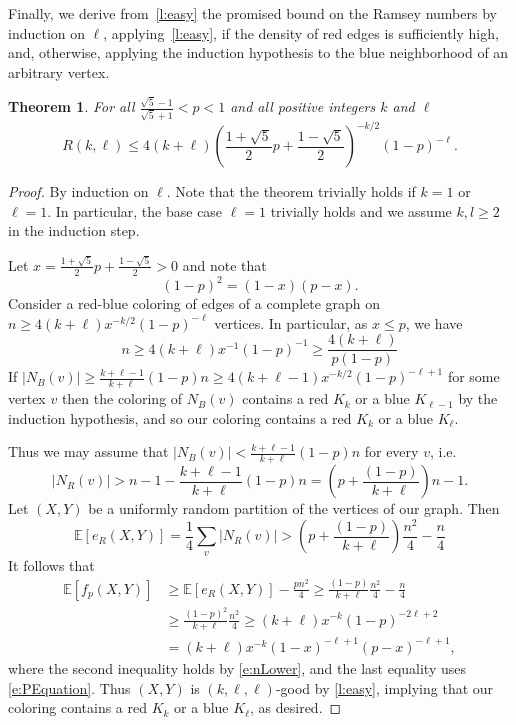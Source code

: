 \documentclass[reqno,final,12pt]{amsart}
\newtheorem{thm}{Theorem}
\newcommand{\bb}[1]{\mathbb{#1}}
\newcommand{\s}[1]{\left(#1\right)}
\begin{document}
Finally, we derive from~\cref{l:easy} the promised bound on the Ramsey numbers by induction on $\ell$, applying~\cref{l:easy}, if the density of red edges is sufficiently high, and, otherwise, applying the induction hypothesis to the blue neighborhood of an arbitrary vertex.  

\begin{thm}\label{t:easy}
	For all $\frac{\sqrt{5}-1}{\sqrt{5}+1}< p <1$ and all positive integers $k$ and  $\ell$ $$R(k,\ell) \leq 4(k+\ell)\s{\frac{1+\sqrt{5}}{2}p+\frac{1-\sqrt{5}}{2}}^{-k/2}(1-p)^{-\ell}.$$
\end{thm}
\begin{proof}
	By induction on $\ell$. Note that the theorem trivially holds if $k=1$ or $\ell =1 $. In particular, the base case $\ell=1$ trivially holds and we assume $k, l \geq 2$ in the induction step.
	
	Let $x = \frac{1+\sqrt{5}}{2}p+\frac{1-\sqrt{5}}{2} >0$ and note that 	\begin{equation}\label{e:PEquation}
(1-p)^2=(1-x)(p-x).
	\end{equation} Consider a red-blue coloring of edges of a complete graph on $n \geq 4(k+\ell)x^{-k/2}(1-p)^{-\ell}$ vertices. 
	In particular, as $x \leq p$, we have \begin{equation}\label{e:nLower} n \geq 4(k+ \ell)x^{-1} (1-p)^{-1} \geq \frac{4(k+\ell)}{p(1-p)}  \end{equation}
	 If $|N_B(v)|\geq \frac{k+\ell-1}{k+\ell}(1-p)n \geq 4(k+\ell-1)x^{-k/2}(1-p)^{-\ell+1}$ for some vertex $v$ then the coloring of $N_B(v)$ contains a red $K_k$ or a blue $K_{\ell-1}$ by the induction hypothesis, and so our  coloring contains a red $K_k$ or a blue $K_\ell$. 
	
	Thus we may assume that $|N_B(v)|< \frac{k+\ell-1}{k+\ell}(1-p)n$ for every $v$, i.e. $$|N_R(v)|> n-1 - \frac{k+\ell-1}{k+\ell}(1-p)n = \s{p +\frac{(1-p)}{k+\ell}}n -1.$$ Let $(X,Y)$ be a uniformly random partition of the vertices of our graph. Then
	$$\bb{E}[e_R(X,Y)] = \frac{1}{4}\sum_{v}|N_R(v)| >  \s{p +\frac{(1-p)}{k+\ell}}\frac{n^2}{4} -\frac{n}{4}$$ 
	It follows that 
	\begin{align*}\bb{E}[f_p(X,Y)] &\geq \bb{E}[e_R(X,Y)] -\frac{pn^2}{4} \geq \frac{(1-p)}{k+\ell}\frac{n^2}{4} -\frac{n}{4}\\& \geq \frac{(1-p)^2}{k+\ell}\frac{n^2}{4}	\geq (k+\ell)x^{-k}(1-p)^{-2\ell+2}\\&=  (k+\ell)x^{-k}(1-x)^{-\ell+1}(p-x)^{-\ell+1},
	\end{align*}
	where the second inequality holds by \eqref{e:nLower}, and the last equality uses \eqref{e:PEquation}. Thus $(X,Y)$ is $(k,\ell,\ell)$-good by \cref{l:easy}, implying that  our  coloring contains a red $K_k$ or a blue $K_\ell$, as desired.
\end{proof}	
\end{document}

